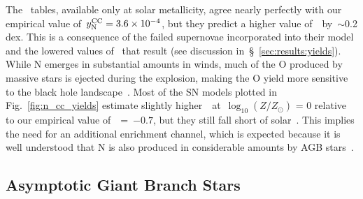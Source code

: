 \documentclass[ms.tex]{subfiles}
\begin{document}
The~\citet{Sukhbold2016} tables, available only at solar metallicity, agree
nearly perfectly with our empirical value of~$y_\text{N}^\text{CC} = 3.6\times10^{-4}$, but
they predict a higher value of~\no\subcc~by~$\sim$0.2 dex.
This is a consequence of the failed supernovae incorporated into their model
and the lowered values of~ that result (see discussion
in~\S~\ref{sec:results:yields}).
While N emerges in substantial amounts in winds, much of the O produced by
massive stars is ejected during the explosion, making the O yield more
sensitive to the black hole landscape~\citep{Griffith2021}.
Most of the SN models plotted in Fig.~\ref{fig:n_cc_yields} estimate slightly
higher~\no\subcc~at~$\log_{10}(Z / Z_\odot)$ = 0 relative to our empirical
value of~\no\subcc~=~$-0.7$, but they still fall short of solar~\no.
This implies the need for an additional enrichment channel, which is expected
because it is well understood that N is also produced in considerable amounts
by AGB stars~\citep[e.g.][]{Johnson2019}.

\subsection{Asymptotic Giant Branch Stars}
\label{sec:yields:agb}
\end{document}
